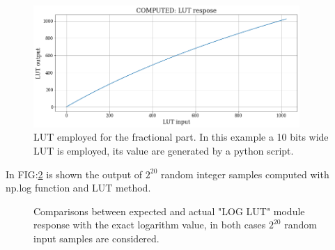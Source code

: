 \documentclass[12pt]{article}
\begin{document}
\begin{figure}[h]
    \includegraphics[width=0.9\textwidth]{Images/LUT_response.png}
    \caption{LUT employed for the fractional part. In this example a 10 bits wide LUT is employed, its value are generated by a python script.}
    \label{fig:LUT_resp}
\end{figure}

In FIG:\ref{fig:LUT_LOG} is shown the output of $2^{20}$ random integer samples computed with np.log function and LUT method.

\begin{figure}[h]
    \begin{minipage}[c]{0.5\linewidth}
        \vspace{0pt}
        \centering
    \end{minipage}%
    \hfill%
    \begin{minipage}[c]{0.5\linewidth}
        \vspace{0pt}
        \centering
    \end{minipage}%
    \caption{Comparisons between expected and actual "LOG LUT" module response with the exact logarithm value, in both cases $2^{20}$ random input samples are considered.}
    \label{fig:LUT_LOG}
\end{figure}
\end{document}
